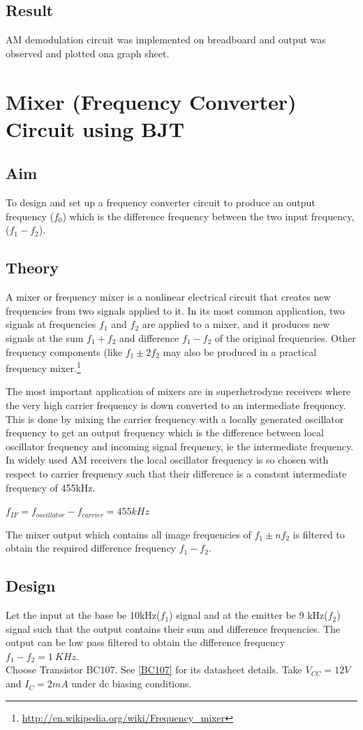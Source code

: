 \documentclass{book}
\begin{document}
\section*{Result}

AM demodulation circuit was implemented on breadboard and output was observed and plotted ona graph sheet.

\chapter[Mixer Circuit using BJT]{Mixer (Frequency Converter) Circuit using BJT}
\section*{Aim}
To design and set up a frequency converter circuit to produce an output frequency ($f_0$) which is the difference frequency between the two input frequency, ($f_{1}-f_{2}$).
\section*{Theory}
A mixer or frequency mixer is a nonlinear electrical circuit that creates new frequencies from two signals applied to it. In its most common application, two signals at frequencies $f_1$ and $f_2$ are applied to a mixer, and it produces new signals at the sum $f_1 + f_2$ and difference $f_1 - f_2$ of the original frequencies. Other frequency components (like $f_1 \pm 2f_2$ may also be produced in a practical frequency mixer.\footnote{\url{http://en.wikipedia.org/wiki/Frequency_mixer}}

The most important application of mixers are in superhetrodyne receivers where the very high carrier frequency is down converted to an intermediate frequency. This is done by mixing the carrier frequency with a locally generated oscillator frequency to get an output frequency which is the difference between local oscillator frequency and incoming signal frequency, ie the intermediate frequency. In widely used AM receivers the local oscillator frequency is so chosen with respect to carrier frequency such that their difference is a constsnt intermediate frequency of 455kHz.\\
\begin{center}
$f_{IF}=f_{oscillator}-f_{carrier}=455 kHz$
\end{center}
The mixer output which contains all image frequencies of $f_1 \pm nf_2$ is filtered to obtain the required difference frequency $f_1-f_2$.
\section*{Design}
Let the input at the base be 10kHz($f_1$) signal and at the emitter be 9 kHz($f_2$) signal such that the output contains their sum and difference frequencies. The output can be low pass filtered to obtain the difference frequency $f_1-f_2=1 \ KHz$.
\\ Choose Transistor BC107. See \ref{BC107} for its datasheet details. 
\noindent Take $V_{CC}=12 V$ and $I_C=2 mA$ under dc biasing conditions.
\end{document}
